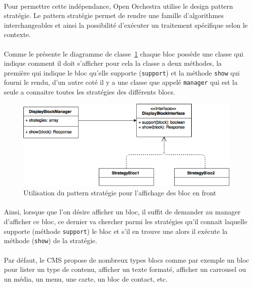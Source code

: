 	       \paragraph{}
	       Pour permettre cette indépendance, Open Orchestra utilise le design pattern stratégie. Le pattern stratégie permet de rendre une famille d'algorithmes interchangeables et ainsi  la possibilité d'exécuter un traitement spécifique selon le contexte.

          \paragraph{}
	       Comme le présente le diagramme de classe~\ref{pattern strategy} chaque bloc possède une classe qui indique comment il doit s'afficher pour cela la classe a deux méthodes, la première qui indique le bloc qu'elle supporte (\verb?support?) et la méthode \verb?show? qui fourni le rendu, d'un autre coté il y a une classe que appelé \verb?manager?  qui est la seule a connaitre toutes les stratégies des différents blocs. 
		\begin{figure}[H]
        \begin{center}
          \includegraphics[scale=1]{images/strategy_block}
        \end{center}
        \caption{Utilisation du pattern stratégie pour l'affichage des bloc en front}
        \label{pattern strategy}
      \end{figure}
         \paragraph{}
	       Ainsi, lorsque que l'on désire afficher un bloc, il suffit de demander au manager d'afficher ce bloc, ce dernier va chercher parmi les stratégies qu'il connait laquelle supporte (méthode \verb?support?) le bloc et s'il en trouve une alors il exécute la méthode (\verb?show?) de la stratégie.
	        
	      	\paragraph{}
	      	Par défaut, le CMS propose de nombreux types blocs  comme par exemple un bloc pour lister un type de contenu, afficher un texte formaté, afficher un carrousel ou un média, un menu, une carte, un bloc de contact, etc.

